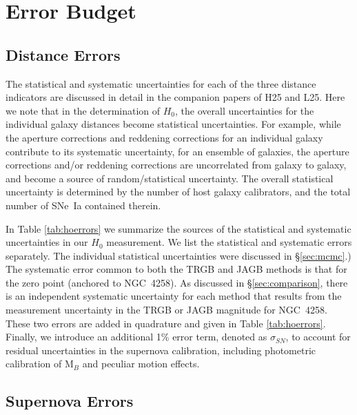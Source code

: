 \documentclass[12pt,modern]{aastex631}
\newcommand{\ho}{$H_{0}$\xspace}
\newcommand{\sne}{SNe~Ia\xspace}
\newcommand{\ngc}{NGC\,\xspace}
\begin{document}
\section{Error Budget}
\label{sec:errors}

\subsection{Distance Errors}

The statistical and systematic uncertainties for each of the three distance indicators are discussed in detail in the companion papers of H25 and L25. 
Here we note that in the determination of \ho, the overall uncertainties for the individual galaxy distances become statistical uncertainties. For example, while the aperture corrections and  reddening corrections for an individual galaxy contribute to its systematic uncertainty, for an ensemble of galaxies, the aperture corrections  and/or reddening corrections are uncorrelated from galaxy to galaxy, and become a source of random/statistical uncertainty. The overall statistical uncertainty is determined by the number of host galaxy calibrators, and the total number of \sne contained therein.

In Table \ref{tab:hoerrors} we summarize the sources of the statistical and systematic uncertainties in our \ho measurement. We list the statistical and systematic errors separately. 
The individual statistical uncertainties were discussed in \S \ref{sec:mcmc}.) 
The systematic error common to both the TRGB and JAGB methods is that for the zero point (anchored to \ngc 4258). As discussed in \S\ref{sec:comparison}, there is an independent systematic uncertainty for each method that results from the measurement uncertainty in the TRGB or JAGB magnitude for \ngc 4258. These two errors are added in quadrature and given in Table \ref{tab:hoerrors}. Finally, we introduce an additional 1\% error term, denoted as $\sigma_{SN}$, to account for residual uncertainties in the supernova calibration, including photometric calibration of M$_B$ and peculiar motion effects.




\subsection{Supernova Errors}
\end{document}
